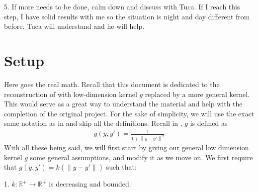 \documentclass[10pt]{article}
\newcommand{\norm}[1]{\left\lVert#1\right\rVert}
\newenvironment{Proof of lemma}{\noindent{\bf Proof of Lemma}}{\hfill$\Box$\newline}
\newenvironment{Proof of claim}{\noindent{\bf Proof of claim}}{\hfill$\Box$\newline}
\newenvironment{Proof of theorem}{\noindent{\bf Proof of Theorem}}{\hfill\scriptsize{$\Box$}\newline}
\newenvironment{Proof of theorems}{\noindent{\bf Proof of Theorems}}{\hfill$\Box$\newline}
\newenvironment{Proof of proposition}{\noindent{\bf Proof of Proposition}}{\hfill$\Box$\newline}
\newenvironment{Proof of propositions}{\noindent{\bf Proof of Propositions}}{\hfill$\Box$\newline}
\newenvironment{Proof of exercise}{\noindent{\it Proof of Exercise:}}{\hfill$\Box$}
\numberwithin{equation}{section}
\begin{document}
5. If more needs to be done, calm down and discuss with Tuca. If I reach this step, I have solid results with me so the situation is night and day different from before. Tuca will understand and he will help.
\section{Setup}
Here goes the real math. Recall that this document is dedicated to the
reconstruction of \cite{auffinger-tsne} with low-dimension kernel $g$ replaced
by a more general kernel. This would serve as a great way to understand the
material and help with the completion of the original project. For the sake of
simplicity, we will use the exact same notation as in \cite{auffinger-tsne} and
skip all the definitions. Recall in \cite{auffinger-tsne}, $g$ is defined as
\begin{align}
    g(y,y') = \frac{1}{1+\norm{y-y'}^2}
\end{align}
With all these being said, we will first start by giving our general low dimension kernel $g$ some general assumptions, and modify it as we move on. We first require that $g(y,y') = k (\norm{y-y'})$ such that:

1. $k: \mathbb{R}^+ \to \mathbb{R}^+$ is decreasing and bounded.
\end{document}
